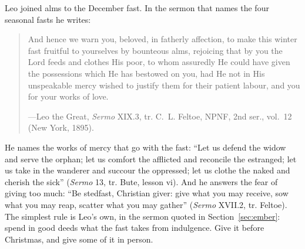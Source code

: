 Leo joined alms to the December fast. In the sermon that names the four seasonal fasts he
writes:

\begin{quote}
And hence we warn you, beloved, in fatherly affection, to make this winter fast fruitful to
yourselves by bounteous alms, rejoicing that by you the Lord feeds and clothes His poor, to whom
assuredly He could have given the possessions which He has bestowed on you, had He not in His
unspeakable mercy wished to justify them for their patient labour, and you for your works of
love.\par
{\smallskip\noindent\small ---Leo the Great, \textit{Sermo} XIX.3, tr. C.~L. Feltoe, NPNF, 2nd
ser., vol.~12 (New York, 1895).\par}
\end{quote}

\noindent He names the works of mercy that go with the fast: ``Let us defend the widow and serve the
orphan; let us comfort the afflicted and reconcile the estranged; let us take in the wanderer and
succour the oppressed; let us clothe the naked and cherish the sick'' (\textit{Sermo} 13, tr.
Bute, lesson vi). And he answers the fear of giving too much: ``Be stedfast, Christian giver: give
what you may receive, sow what you may reap, scatter what you may gather'' (\textit{Sermo} XVII.2,
tr. Feltoe). The simplest rule is Leo's own, in the sermon quoted in Section~\ref{sec:ember}:
spend in good deeds what the fast takes from indulgence. Give it before Christmas, and give some of it in person.
